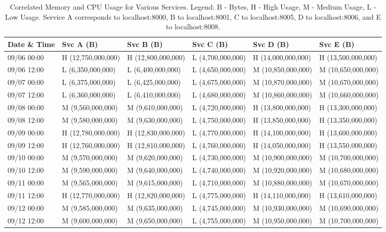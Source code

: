 \documentclass[journal]{IEEEtran}
\begin{document}
\begin{table}
  \centering
  \scriptsize %
  \setlength{\tabcolsep}{10pt} %
  \begin{tabular}{|l|l|l|l|l|l|}
  \hline
  \textbf{Date \& Time} & \textbf{Svc A (B)} & \textbf{Svc B (B)} & \textbf{Svc C (B)} & \textbf{Svc D (B)} & \textbf{Svc E (B)} \\ \hline
  09/06 00:00 & H (12,750,000,000) & H (12,800,000,000) & L (4,700,000,000) & H (14,000,000,000) & H (13,500,000,000) \\ \hline
  09/06 12:00 & L (6,350,000,000)  & L (6,400,000,000)  & L (4,650,000,000) & M (10,850,000,000) & M (10,650,000,000) \\ \hline
  09/07 00:00 & L (6,375,000,000)  & L (6,425,000,000)  & L (4,675,000,000) & M (10,870,000,000) & M (10,670,000,000) \\ \hline
  09/07 12:00 & L (6,360,000,000)  & L (6,410,000,000)  & L (4,680,000,000) & M (10,860,000,000) & M (10,660,000,000) \\ \hline
  09/08 00:00 & M (9,560,000,000)  & M (9,610,000,000)  & L (4,720,000,000) & H (13,800,000,000) & H (13,300,000,000) \\ \hline
  09/08 12:00 & M (9,580,000,000)  & M (9,630,000,000)  & L (4,750,000,000) & H (13,850,000,000) & H (13,350,000,000) \\ \hline
  09/09 00:00 & H (12,780,000,000) & H (12,830,000,000) & L (4,770,000,000) & H (14,100,000,000) & H (13,600,000,000) \\ \hline
  09/09 12:00 & H (12,760,000,000) & H (12,810,000,000) & L (4,760,000,000) & H (14,050,000,000) & H (13,550,000,000) \\ \hline
  09/10 00:00 & M (9,570,000,000)  & M (9,620,000,000)  & L (4,730,000,000) & M (10,900,000,000) & M (10,700,000,000) \\ \hline
  09/10 12:00 & M (9,590,000,000)  & M (9,640,000,000)  & L (4,740,000,000) & M (10,920,000,000) & M (10,680,000,000) \\ \hline
  09/11 00:00 & M (9,565,000,000)  & M (9,615,000,000)  & L (4,710,000,000) & M (10,880,000,000) & M (10,670,000,000) \\ \hline
  09/11 12:00 & H (12,770,000,000) & H (12,820,000,000) & L (4,775,000,000) & H (14,110,000,000) & H (13,610,000,000) \\ \hline
  09/12 00:00 & M (9,585,000,000)  & M (9,635,000,000)  & L (4,745,000,000) & M (10,930,000,000) & M (10,690,000,000) \\ \hline
  09/12 12:00 & M (9,600,000,000)  & M (9,650,000,000)  & L (4,755,000,000) & M (10,950,000,000) & M (10,700,000,000) \\ \hline
  \end{tabular}
  \caption{Correlated Memory and CPU Usage for Various Services. Legend: B - Bytes, H - High Usage, M - Medium Usage, L - Low Usage. Service A corresponds to localhost:8000, B to localhost:8001, C to localhost:8005, D to localhost:8006, and E to localhost:8008.}
  \label{table:memory-cpu-correlation}
\end{table}
\end{document}

